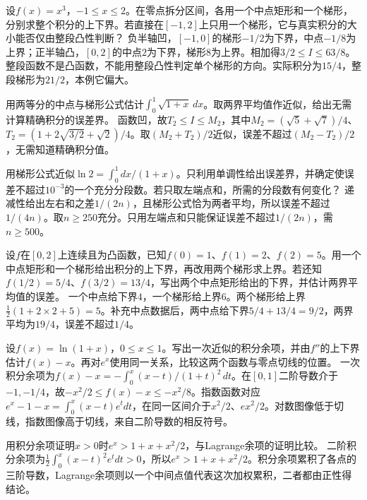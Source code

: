 设\(f(x)=x^3\)，\(-1\le x\le2\)。在零点拆分区间，各用一个中点矩形和一个梯形，分别求整个积分的上下界。若直接在\([-1,2]\)上只用一个梯形，它与真实积分的大小能否仅由整段凸性判断？
\solutionanswer
负半轴凹，\([-1,0]\)的梯形\(-1/2\)为下界，中点\(-1/8\)为上界；正半轴凸，\([0,2]\)的中点\(2\)为下界，梯形\(8\)为上界。相加得\(3/2\le I\le63/8\)。整段函数不是凸函数，不能用整段凸性判定单个梯形的方向。实际积分为\(15/4\)，整段梯形为\(21/2\)，本例它偏大。


用两等分的中点与梯形公式估计\(\int_0^1\sqrt{1+x}\,dx\)。取两界平均值作近似，给出无需计算精确积分的误差界。
\solutionanswer
函数凹，故\(T_2\le I\le M_2\)，其中\(M_2=(\sqrt5+\sqrt7)/4\)、\(T_2=(1+2\sqrt{3/2}+\sqrt2)/4\)。取\((M_2+T_2)/2\)近似，误差不超过\((M_2-T_2)/2\)，无需知道精确积分值。


用梯形公式近似\(\ln2=\int_0^1dx/(1+x)\)。只利用单调性给出误差界，并确定使误差不超过\(10^{-3}\)的一个充分分段数。若只取左端点和，所需的分段数有何变化？
\solutionanswer
递减性给出左右和之差\(1/(2n)\)，且梯形公式恰为两者平均，所以误差不超过\(1/(4n)\)。取\(n\ge250\)充分。只用左端点和只能保证误差不超过\(1/(2n)\)，需\(n\ge500\)。


设\(f\)在\([0,2]\)上连续且为凸函数，已知\(f(0)=1\)、\(f(1)=2\)、\(f(2)=5\)。用一个中点矩形和一个梯形给出积分的上下界，再改用两个梯形求上界。若还知\(f(1/2)=5/4\)、\(f(3/2)=13/4\)，写出两个中点矩形给出的下界，并估计两界平均值的误差。
\solutionanswer
一个中点给下界\(4\)，一个梯形给上界\(6\)。两个梯形给上界\(\frac12(1+2\times2+5)=5\)。补充中点数据后，两中点给下界\(5/4+13/4=9/2\)，两界平均为\(19/4\)，误差不超过\(1/4\)。


设\(f(x)=\ln(1+x)\)，\(0\le x\le1\)。写出一次近似的积分余项，并由\(f''\)的上下界估计\(f(x)-x\)。再对\(e^x\)使用同一关系，比较这两个函数与零点切线的位置。
\solutionanswer
一次积分余项为\(f(x)-x=-\int_0^x(x-t)/(1+t)^2\,dt\)。在\([0,1]\)二阶导数介于\(-1,-1/4\)，故\(-x^2/2\le f(x)-x\le-x^2/8\)。指数函数对应\(e^x-1-x=\int_0^x(x-t)e^t dt\)，在同一区间介于\(x^2/2\)、\(ex^2/2\)。对数图像低于切线，指数图像高于切线，来自二阶导数的相反符号。


用积分余项证明\(x>0\)时\(e^x>1+x+x^2/2\)，与Lagrange余项的证明比较。
\solutionanswer
二阶积分余项为\(\frac12\int_0^x(x-t)^2e^t dt>0\)，所以\(e^x>1+x+x^2/2\)。积分余项累积了各点的三阶导数，Lagrange余项则以一个中间点值代表这次加权累积，二者都由正性得结论。


